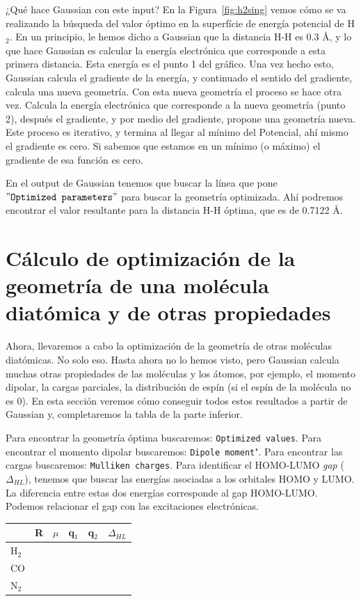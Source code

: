 \documentclass{tufte-book}
\begin{document}
¿Qué hace Gaussian con este input? En la Figura~\ref{fig:h2sing}
vemos cómo se va realizando la búsqueda del valor óptimo en la
superfície de energía potencial de H$_2$. En un principio, le 
hemos dicho a Gaussian que la distancia H-H es 0.3 {\AA}, y lo 
que hace  Gaussian es calcular la energía electrónica que
corresponde a esta primera distancia. Esta energía es el punto
1 del gráfico. Una 
vez hecho esto, Gaussian calcula el gradiente de la energía, y
continuado el sentido del gradiente, calcula una nueva geometría.
Con esta nueva geometría el proceso se hace otra vez. Calcula la
energía electrónica que corresponde a la nueva geometría (punto 2),
después el gradiente, y por medio del gradiente, propone una geometría nueva. Este proceso es iterativo, y termina al llegar al mínimo del Potencial, ahí mismo el gradiente es cero. Si sabemos que estamos en un mínimo (o máximo) el gradiente de esa función es cero.

En el output de Gaussian tenemos que buscar la línea que pone 
$"\texttt{Optimized parameters}"$ para buscar la geometría 
optimizada. Ahí podremos encontrar el valor resultante para 
la distancia H-H óptima, que es de 0.7122 {\AA}.

\section{Cálculo de optimización de la geometría de una molécula diatómica y de otras propiedades}
Ahora, llevaremos a cabo la optimización de la geometría 
de otras moléculas diatómicas. No solo eso. Hasta ahora no
lo hemos visto, pero Gaussian calcula muchas otras propiedades
de las moléculas y los átomos, por ejemplo, el momento dipolar,
la cargas parciales, la distribución de espín (si el espín de
la molécula no es 0). En esta sección veremos cómo conseguir 
todos estos resultados a partir de Gaussian y, completaremos 
la tabla de la parte inferior. 

Para encontrar la geometría óptima buscaremos: 
\texttt{Optimized values}. Para encontrar el momento
dipolar buscaremos: \texttt{Dipole moment}". Para encontrar 
las cargas buscaremos: \texttt{Mulliken charges}. Para 
identificar el HOMO-LUMO  \textit{gap} ($\Delta_{HL}$),
tenemos que buscar las energías asociadas a los orbitales HOMO
y LUMO. La diferencia entre  estas dos energías corresponde 
al gap HOMO-LUMO. Podemos relacionar el gap con las 
excitaciones electrónicas.

\begin{table}[h!]
\centering
	\scriptsize
	\begin{tabular}{llllll}
	\toprule
	   & R &$\mu$ & q$_1$ & q$_2$ & $\Delta_{HL}$ \\
		\hline
		H$_2$ &   &   &   &  &   \\       
		CO    &   &   &   &  &   \\       
		N$_2$ &   &   &   &  &   \\
	\bottomrule	
    \end{tabular}
\end{table}
\end{document}
